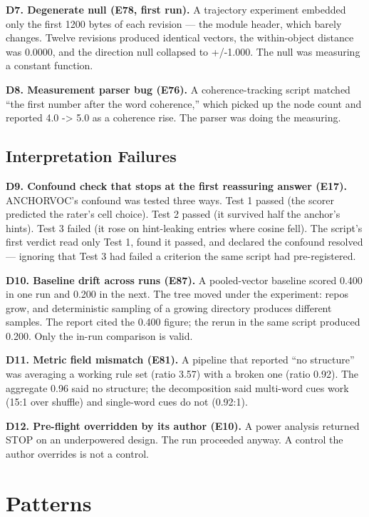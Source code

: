 \documentclass[11pt]{article}
\begin{document}
\textbf{D7. Degenerate null (E78, first run).} A trajectory experiment
embedded only the first 1200 bytes of each revision --- the module header,
which barely changes. Twelve revisions produced identical vectors, the
within-object distance was 0.0000, and the direction null collapsed to
+/-1.000. The null was measuring a constant function.

\textbf{D8. Measurement parser bug (E76).} A coherence-tracking script
matched ``the first number after the word coherence,'' which picked up
the node count and reported 4.0 -> 5.0 as a coherence rise. The parser
was doing the measuring.

\subsection{Interpretation Failures}

\textbf{D9. Confound check that stops at the first reassuring answer
(E17).} ANCHORVOC's confound was tested three ways. Test 1 passed (the
scorer predicted the rater's cell choice). Test 2 passed (it survived
half the anchor's hints). Test 3 failed (it rose on hint-leaking entries
where cosine fell). The script's first verdict read only Test 1, found it
passed, and declared the confound resolved --- ignoring that Test 3 had
failed a criterion the same script had pre-registered.

\textbf{D10. Baseline drift across runs (E87).} A pooled-vector baseline
scored 0.400 in one run and 0.200 in the next. The tree moved under the
experiment: repos grow, and deterministic sampling of a growing directory
produces different samples. The report cited the 0.400 figure; the rerun
in the same script produced 0.200. Only the in-run comparison is valid.

\textbf{D11. Metric field mismatch (E81).} A pipeline that reported
``no structure'' was averaging a working rule set (ratio 3.57) with a
broken one (ratio 0.92). The aggregate 0.96 said no structure; the
decomposition said multi-word cues work (15:1 over shuffle) and
single-word cues do not (0.92:1).

\textbf{D12. Pre-flight overridden by its author (E10).} A power analysis
returned STOP on an underpowered design. The run proceeded anyway. A
control the author overrides is not a control.

\section{Patterns}
\end{document}
